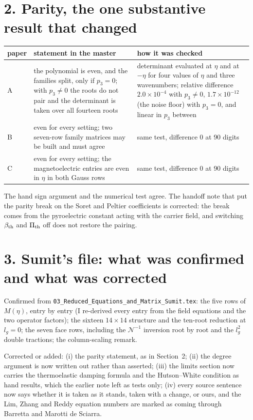 \documentclass[11pt]{article}
\begin{document}
\section*{2. Parity, the one substantive result that changed}

\begin{center}
\begin{tabular}{p{2.2cm}p{7.0cm}p{4.6cm}}
\toprule
paper & statement in the master & how it was checked\\
\midrule
A & the polynomial is even, and the families split, only if $p_3=0$; with $p_3\ne0$ the roots do not pair
and the determinant is taken over all fourteen roots & determinant evaluated at $\eta$ and at $-\eta$ for
four values of $\eta$ and three wavenumbers; relative difference $2.0\times10^{-4}$ with $p_3\ne0$,
$1.7\times10^{-12}$ (the noise floor) with $p_3=0$, and linear in $p_3$ between\\
B & even for every setting; two seven-row family matrices may be built and must agree & same test,
difference $0$ at 90 digits\\
C & even for every setting; the magnetoelectric entries are even in $\eta$ in both Gauss rows & same test,
difference $0$ at 90 digits\\
\bottomrule
\end{tabular}
\end{center}

The hand sign argument and the numerical test agree. The handoff note that put the parity break on the
Soret and Peltier coefficients is corrected: the break comes from the pyroelectric constant acting with the
carrier field, and switching $\beta_{\rm th}$ and $\Pi_{\rm th}$ off does not restore the pairing.

\section*{3. Sumit's file: what was confirmed and what was corrected}

Confirmed from \texttt{03\_Reduced\_Equations\_and\_Matrix\_Sumit.tex}: the five rows of $M(\eta)$, entry by
entry (I re-derived every entry from the field equations and the two operator factors); the sixteen
$14\times14$ structure and the ten-root reduction at $l_g=0$; the seven face rows, including the
$\mathcal N^{-1}$ inversion root by root and the $l_g^2$ double tractions; the column-scaling remark.

Corrected or added: (i) the parity statement, as in Section~2; (ii) the degree argument is now written out
rather than asserted; (iii) the limits section now carries the thermoelastic damping formula and the
Hutson--White condition as hand results, which the earlier note left as tests only; (iv) every source
sentence now says whether it is taken as it stands, taken with a change, or ours, and the Lim, Zhang and
Reddy equation numbers are marked as coming through Barretta and Marotti de Sciarra.
\end{document}
